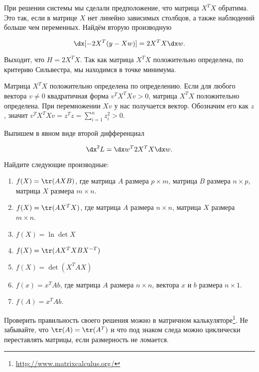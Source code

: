 \begin{sol}
При решении системы мы сделали предположение, что матрица $X^TX$ обратима. Это так, если в матрице $X$ нет линейно зависимых столбцов, а также наблюдений больше чем переменных. Найдём вторую производную 

\[
\dx[-2X^T(y-Xw)] = 2X^TX \dx w.
\]

Выходит, что $H = 2X^TX$. Так как матрица $X^TX$ положительно определена, по критерию Сильвестра, мы находимся в точке минимума. 

Матрица $X^TX$ положительно определена по определению. Если для любого вектора $v \ne 0$ квадратичная форма $v^T X^TX v > 0$, матрица  $X^TX$ положительно определена. При перемножении $Xv$ у нас получается вектор. Обозначим его как $z$, значит $v^T X^TX v = z^T z = \sum_{i=1}^n z_i^2 > 0$. 

Выпишем в явном виде второй дифференциал 

\[
\dx^2 L = \dx w^T 2X^TX \dx w.
\]
\end{sol} 


\begin{problem}{}
	Найдите следующие производные:
	\begin{enumerate}
		\item $f(X) = \tr(AXB)$, где матрица $A$ размера $p \times m$, матрица $B$ размера $n \times p$, матрица $X$ размера $m \times n$.  %
		
		\item $f(X) = \tr(AX^TX)$, где матрица $A$ размера $n \times n$, матрица $X$ размера $m \times n$.  %
		
		\item $f(X) = \ln \det X$ %
		
		\item $f(X) = \tr(AX^TXBX^{-T})$
		
		\item $f(X) = \det(X^TAX)$
		
		\item $f(x) = x^TAb$, где матрица $A$ размера $n \times n$, вектора $x$ и $b$ размера $n \times 1$. 
		
		\item $f(A) = x^TAb$. 
	\end{enumerate}
\end{problem}
\begin{sol} 
Проверить правильность своего решения можно в матричном калькуляторе\footnote{ \url{http://www.matrixcalculus.org/}}. Не забывайте, что $\tr(A) = \tr(A^T)$ и что под знаком следа можно циклически переставлять матрицы, если размерность не ломается. 
\end{sol} 


